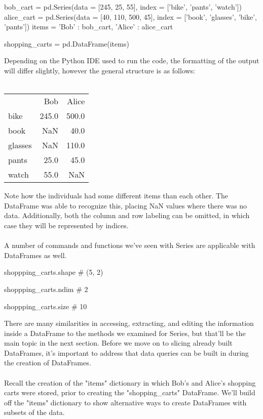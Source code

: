 \documentclass{article}
\begin{document}
\begin{python}
	bob_cart = pd.Series(data = [245, 25, 55], index = ['bike', 'pants', 'watch'])
	alice_cart = pd.Series(data = [40, 110, 500, 45], index = ['book', 'glasses', 'bike', 'pants'])
	items = {'Bob' : bob_cart, 'Alice' : alice_cart}
	
	shopping_carts = pd.DataFrame(items)
\end{python}

Depending on the Python IDE used to run the code, the formatting of the output will differ slightly, however the general structure is as follows:
\\\\

\begin{center}
\begin{tabular}{lrr}
	{} &    Bob &  Alice \\
	bike    &  245.0 &  500.0 \\
	book    &    NaN &   40.0 \\
	glasses &    NaN &  110.0 \\
	pants   &   25.0 &   45.0 \\
	watch   &   55.0 &    NaN \\
\end{tabular}
\end{center}

Note how the individuals had some different items than each other. The DataFrame was able to recognize this, placing NaN values where there was no data. Additionally, both the column and row labeling can be omitted, in which case they will be represented by indices.
\\\\
A number of commands and functions we've seen with Series are applicable with DataFrames as well.

\begin{python}
	shoppping_carts.shape
	# (5, 2)
	
	shoppping_carts.ndim
	# 2
	
	shoppping_carts.size
	# 10
\end{python}

There are many similarities in accessing, extracting, and editing the information inside a DataFrame to the methods we examined for Series, but that'll be the main topic in the next section. Before we move on to slicing already built DataFrames, it's important to address that data queries can be built in during the creation of DataFrames.
\\\\
Recall the creation of the "items" dictionary in which Bob's and Alice's shopping carts were stored, prior to creating the "shopping\_carts" DataFrame. We'll build off the "items" dictionary to show alternative ways to create DataFrames with subsets of the data.
\end{document}
